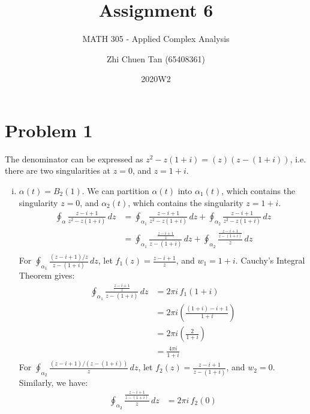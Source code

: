 \documentclass[a4paper, titlepage, DIV=14]{scrartcl}
\title{Assignment 6}
\subtitle{MATH 305 - Applied Complex Analysis}
\author{Zhi Chuen Tan (65408361)}
\date{2020W2}
\begin{document}
    \onehalfspacing
    \hypersetup{pageanchor=false}
    \begin{titlepage}
        \maketitle
        \vfill
        
    \end{titlepage}
    \hypersetup{pageanchor=true}

    \section*{Problem 1}
    The denominator can be expressed as $z^{2}-z(1+i)=(z)(z-(1+i))$, i.e. there are two singularities at 
    $z=0$, and $z=1+i$.

    \begin{enumerate}[i)]
        \item $\alpha(t) = B_{2}(1)$. We can partition $\alpha(t)$ into $\alpha_{1}(t)$, which contains
        the singularity $z=0$, and $\alpha_{2}(t)$, which contains the singularity $z=1+i$.
        \begin{align*}
            \oint_{\alpha} \frac{z-i+1}{z^{2}-z(1+i)} \, dz &= \oint_{\alpha_{1}} \frac{z-i+1}{z^{2}-z(1+i)} \, dz +
                    \oint_{\alpha_{2}} \frac{z-i+1}{z^{2}-z(1+i)} \, dz \\
                &= \oint_{\alpha_{1}} \frac{\frac{z-i+1}{z}}{z-(1+i)} \, dz +
                    \oint_{\alpha_{2}} \frac{\frac{z-i+1}{z-(1+i)}}{z} \, dz \\
        \end{align*}
        For $\oint_{\alpha_{1}} \frac{(z-i+1)/z}{z-(1+i)} \, dz$, let $f_{1}(z)=\frac{z-i+1}{z}$, 
        and $w_{1}=1+i$. Cauchy's Integral Theorem gives:
        \begin{align}
            \oint_{\alpha_{1}} \frac{\frac{z-i+1}{z}}{z-(1+i)} \, dz &= 2\pi i \, f_{1}(1+i) \nonumber\\
                &= 2\pi i (\frac{(1+i)-i+1}{1+i}) \nonumber \\
                &= 2\pi i (\frac{2}{1+i}) \nonumber\\
                &= \frac{4\pi i}{1+i} \label{eq:1.a1}
        \end{align}
        For $\oint_{\alpha_{2}} \frac{(z-i+1)/(z-(1+i))}{z} \, dz$, let $f_{2}(z)=\frac{z-i+1}{z-(1+i)}$, and
        $w_{2}=0$. Similarly, we have:
        \begin{align*}
            \oint_{\alpha_{2}} \frac{\frac{z-i+1}{z-(1+i)}}{z} \, dz &= 2\pi i \, f_{2}(0) \\

\end{align*}
\end{enumerate}
\end{document}
